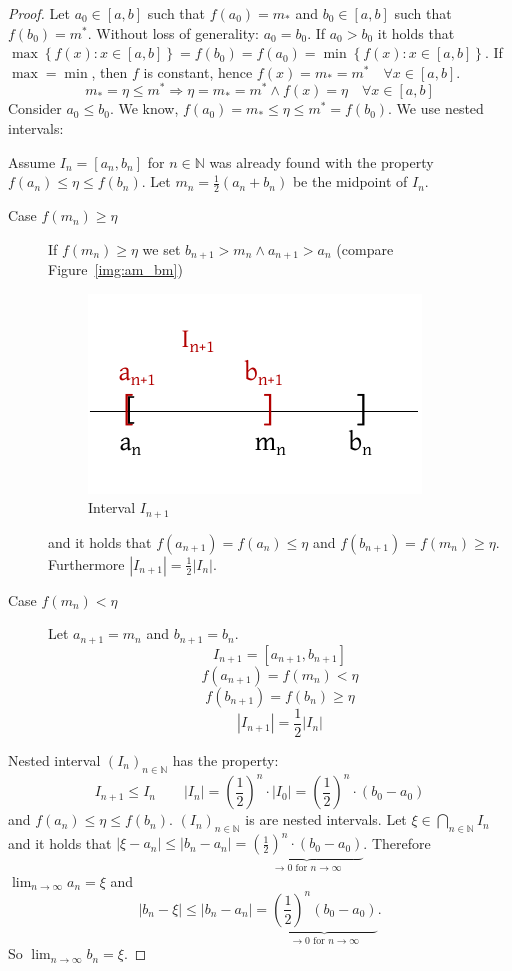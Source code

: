 \documentclass[a4paper,landscape,twocolumn]{article}
\theoremstyle{definition}
\newcommand\set[1]{\left\{#1\right\}}
\newcommand\abs[1]{\left|#1\right|}
\newcommand\seq[1]{{\left(#1\right)}_{n \in \mathbb N}}
\begin{document}
\begin{proof}
  Let $a_0 \in [a, b]$ such that $f(a_0) = m_*$ and $b_0 \in [a, b]$ such that $f(b_0) = m^*$.
  Without loss of generality: $a_0 = b_0$.
  If $a_0 > b_0$ it holds that $\max\set{f(x): x \in [a,b]} = f(b_0) = f(a_0) = \min\set{f(x): x \in [a, b]}$.
  If $\max = \min$, then $f$ is constant, hence $f(x) = m_* = m^* \quad\forall x \in [a, b]$.
  \[ m_* = \eta \leq m^* \Rightarrow \eta = m_* = m^* \land f(x) = \eta \quad\forall x \in [a,b] \]
  Consider $a_0 \leq b_0$. We know, $f(a_0) = m_* \leq \eta \leq m^* = f(b_0)$.
  We use nested intervals:

  Assume $I_n = [a_n, b_n]$ for $n \in \mathbb N$ was already found with the property $f(a_n) \leq \eta \leq f(b_n)$.
  Let $m_n = \frac12 (a_n + b_n)$ be the midpoint of $I_n$.
  \begin{description}
    \item[Case $f(m_n) \geq \eta$]
      If $f(m_n) \geq \eta$ we set $b_{n+1} > m_n \land a_{n+1} > a_n$ (compare Figure~\ref{img:am_bm})
      \begin{figure}[!h]
        \begin{center}
          \includegraphics{img/am_bm.pdf}
          \caption{Interval $I_{n+1}$}
        \end{center}
      \end{figure}
      and it holds that $f(a_{n+1}) = f(a_n) \leq \eta$ and $f(b_{n+1}) = f(m_n) \geq \eta$.
      Furthermore $\abs{I_{n+1}} = \frac12 \abs{I_n}$.
    \item[Case $f(m_n) < \eta$]
      Let $a_{n+1} = m_n$ and $b_{n + 1} = b_n$.
      \[ I_{n+1} = [a_{n+1}, b_{n+1}] \]
      \[ f(a_{n+1}) = f(m_n) < \eta \]
      \[ f(b_{n+1}) = f(b_n) \geq \eta \]
      \[ \abs{I_{n+1}} = \frac12 \abs{I_n} \]
  \end{description}
  Nested interval $\seq{I_n}$ has the property:
  \[ I_{n+1} \leq I_n \qquad \abs{I_n} = \left(\frac12\right)^n \cdot \abs{I_0} = \left(\frac12\right)^n \cdot (b_0 - a_0) \]
  and $f(a_n) \leq \eta \leq f(b_n)$. $\seq{I_n}$ is are nested intervals.
  Let $\xi \in \bigcap_{n\in\mathbb N} I_n$ and it holds that $\abs{\xi - a_n} \leq \abs{b_n - a_n} = \underbrace{\left(\frac12\right)^n \cdot (b_0 - a_0)}_{\to 0 \text{ for } n \to \infty}$.
  Therefore $\lim_{n\to\infty} a_n = \xi$ and
  \[
    \abs{b_n - \xi} \leq \abs{b_n - a_n}
    = \underbrace{\left(\frac12\right)^n (b_0 - a_0)}_{\to 0 \text{ for } n \to \infty}.
  \]
  So $\lim_{n\to\infty} b_n = \xi$.


\end{proof}
\end{document}
